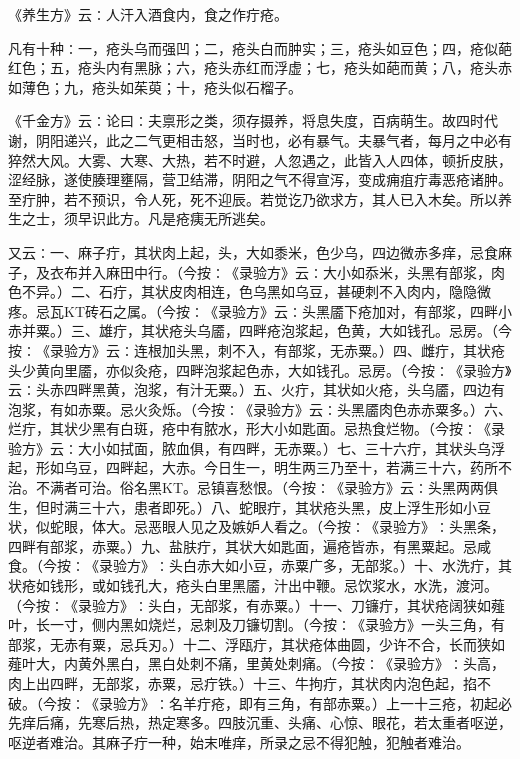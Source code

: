 \documentclass[a4paper,12pt,UTF8,twoside]{ctexbook}
\begin{document}
《养生方》云∶人汗入酒食内，食之作疔疮。

凡有十种∶一，疮头乌而强凹；二，疮头白而肿实；三，疮头如豆色；四，疮似葩红色；五，疮头内有黑脉；六，疮头赤红而浮虚；七，疮头如葩而黄；八，疮头赤如薄色；九，疮头如茱萸；十，疮头似石榴子。

《千金方》云∶论曰∶夫禀形之类，须存摄养，将息失度，百病萌生。故四时代谢，阴阳递兴，此之二气更相击怒，当时也，必有暴气。夫暴气者，每月之中必有猝然大风。大雾、大寒、大热，若不时避，人忽遇之，此皆入人四体，顿折皮肤，涩经脉，遂使腠理壅隔，营卫结滞，阴阳之气不得宣泻，变成痈疽疔毒恶疮诸肿。至疔肿，若不预识，令人死，死不迎辰。若觉讫乃欲求方，其人已入木矣。所以养生之士，须早识此方。凡是疮痍无所逃矣。

又云∶一、麻子疔，其状肉上起，头，大如黍米，色少乌，四边微赤多痒，忌食麻子，及衣布并入麻田中行。（今按∶《录验方》云∶大小如忝米，头黑有部浆，肉色不异。）二、石疔，其状皮肉相连，色乌黑如乌豆，甚硬刺不入肉内，隐隐微疼。忌瓦KT砖石之属。（今按∶《录验方》云∶头黑靥下疮加对，有部浆，四畔小赤并粟。）三、雄疔，其状疮头乌靥，四畔疮泡浆起，色黄，大如钱孔。忌房。（今按∶《录验方》云∶连根加头黑，刺不入，有部浆，无赤粟。）四、雌疔，其状疮头少黄向里靥，亦似灸疮，四畔泡浆起色赤，大如钱孔。忌房。（今按∶《录验方》云∶头赤四畔黑黄，泡浆，有汁无粟。）五、火疔，其状如火疮，头乌靥，四边有泡浆，有如赤粟。忌火灸烁。（今按∶《录验方》云∶头黑靥肉色赤赤粟多。）六、烂疔，其状少黑有白斑，疮中有脓水，形大小如匙面。忌热食烂物。（今按∶《录验方》云∶大小如拭面，脓血俱，有四畔，无赤粟。）七、三十六疔，其状头乌浮起，形如乌豆，四畔起，大赤。今日生一，明生两三乃至十，若满三十六，药所不治。不满者可治。俗名黑KT。忌镇喜愁恨。（今按∶《录验方》云∶头黑两两俱生，但时满三十六，患者即死。）八、蛇眼疔，其状疮头黑，皮上浮生形如小豆状，似蛇眼，体大。忌恶眼人见之及嫉妒人看之。（今按∶《录验方》∶头黑条，四畔有部浆，赤粟。）九、盐肤疔，其状大如匙面，遍疮皆赤，有黑粟起。忌咸食。（今按∶《录验方》∶头白赤大如小豆，赤粟广多，无部浆。）十、水洗疔，其状疮如钱形，或如钱孔大，疮头白里黑靥，汁出中鞭。忌饮浆水，水洗，渡河。（今按∶《录验方》∶头白，无部浆，有赤粟。）十一、刀镰疔，其状疮阔狭如薤叶，长一寸，侧内黑如烧烂，忌刺及刀镰切割。（今按∶《录验方》一头三角，有部浆，无赤有粟，忌兵刃。）十二、浮瓯疔，其状疮体曲圆，少许不合，长而狭如薤叶大，内黄外黑白，黑白处刺不痛，里黄处刺痛。（今按∶《录验方》∶头高，肉上出四畔，无部浆，赤粟，忌疔铁。）十三、牛拘疔，其状肉内泡色起，掐不破。（今按∶《录验方》∶名羊疔疮，即有三角，有部赤粟。）上一十三疮，初起必先痒后痛，先寒后热，热定寒多。四肢沉重、头痛、心惊、眼花，若太重者呕逆，呕逆者难治。其麻子疔一种，始末唯痒，所录之忌不得犯触，犯触者难治。
\end{document}
